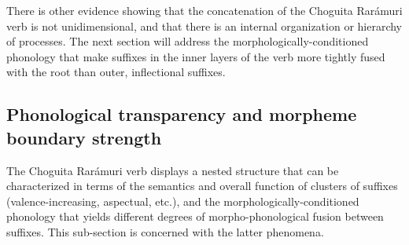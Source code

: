

There is other evidence showing that the concatenation of the Choguita Rarámuri verb is not unidimensional, and that there is an internal organization or hierarchy of processes. The next section will address the morphologically-conditioned phonology that make suffixes in the inner layers of the verb more tightly fused with the root than outer, inflectional suffixes.

\subsection{Phonological transparency and morpheme boundary strength}
\label{subsec: phonological transparency and morpheme boundary strenght}

The Choguita Rarámuri verb displays a nested structure that can be characterized in terms of the semantics and overall function of clusters of suffixes (valence-increasing, aspectual, etc.), and the morphologically-conditioned phonology that yields different degrees of morpho-phonological fusion between suffixes. This sub-section is concerned with the latter phenomena.


